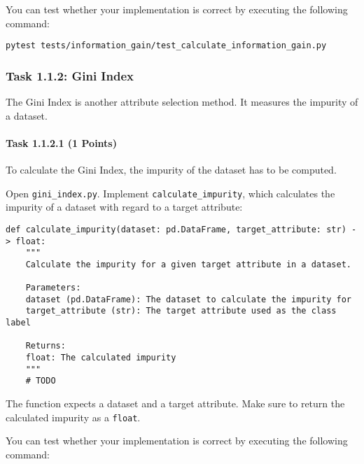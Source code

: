 \documentclass[
english,
smallborders
]{i6prcsht}
\newcommand{\points}[1]{\hfill \color{red}(#1 Points)\color{black}}
\begin{document}
You can test whether your implementation is correct by executing the following command:

\vspace*{0.3cm}

\begin{lstlisting}
pytest tests/information_gain/test_calculate_information_gain.py
\end{lstlisting}

\vspace*{0.1cm}

\subsubsection*{Task 1.1.2: Gini Index}

The Gini Index is another attribute selection method. It measures the impurity of a dataset.

\paragraph*{Task 1.1.2.1 \points{1}} \hfill

To calculate the Gini Index, the impurity of the dataset has to be computed.

Open \texttt{gini\_index.py}. Implement \texttt{calculate\_impurity}, which calculates the impurity of a dataset with regard to a target attribute:

\vspace*{0.3cm}

\begin{lstlisting}
def calculate_impurity(dataset: pd.DataFrame, target_attribute: str) -> float:
    """
    Calculate the impurity for a given target attribute in a dataset.

    Parameters:
    dataset (pd.DataFrame): The dataset to calculate the impurity for
    target_attribute (str): The target attribute used as the class label

    Returns:
    float: The calculated impurity
    """
    # TODO
\end{lstlisting}

\vspace*{0.1cm}

The function expects a dataset and a target attribute. Make sure to return the calculated impurity as a \texttt{float}.

You can test whether your implementation is correct by executing the following command:

\vspace*{0.3cm}
\end{document}
